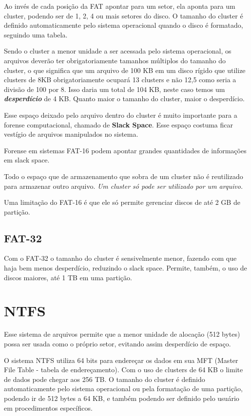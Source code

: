 Ao invés de cada posição da FAT apontar para um setor, ela aponta para um cluster, podendo ser de 1, 2, 4 ou mais setores do disco. O tamanho do cluster é definido automaticamente pelo sistema operacional quando o disco é formatado, seguindo uma tabela.

Sendo o cluster a menor unidade a ser acessada pelo sistema operacional, os arquivos deverão ter obrigatoriamente tamanhos múltiplos do tamanho do cluster, o que significa que um arquivo de 100 KB em um disco rígido que utilize clusters de 8KB obrigatoriamente ocupará 13 clusters e não 12,5 como seria a divisão de 100 por 8. Isso daria um total de 104 KB, neste caso temos um \emph{\textbf{desperdício}} de 4 KB. Quanto maior o tamanho do cluster, maior o desperdício.

Esse espaço deixado pelo arquivo dentro do cluster é muito importante para a forense computacional, chamado de \textbf{Slack Space}. Esse espaço costuma ficar vestígio de arquivos manipulados no sistema. 

\begin{citacao}
  Forense em sistemas FAT-16 podem apontar grandes quantidades de informações em slack space.
\end{citacao}

Todo o espaço que de armazenamento que sobra de um cluster não é reutilizado para armazenar outro arquivo. \emph{Um cluster só pode ser utilizado por um arquivo.}

Uma limitação do FAT-16 é que ele só permite gerenciar discos de até 2 GB de partição.

\subsection{FAT-32}

Com o FAT-32 o tamanho do cluster é sensivelmente menor, fazendo com que haja bem menos desperdício, reduzindo o slack space. Permite, também, o uso de discos maiores, até 1 TB em uma partição.

\section{NTFS}

Esse sistema de arquivos permite que a menor unidade de alocação (512 bytes) possa ser usada como o próprio setor, evitando assim desperdício de espaço.

O sistema NTFS utiliza 64 bits para endereçar os dados em sua MFT (Master File Table - tabela de endereçamento). Com o uso de clusters de 64 KB o limite de dados pode chegar aos 256 TB. O tamanho do cluster é definido automaticamente pelo sistema operacional ou pela formatação de uma partição, podendo ir de 512 bytes a 64 KB, e também podendo ser definido pelo usuário em procedimentos específicos.


